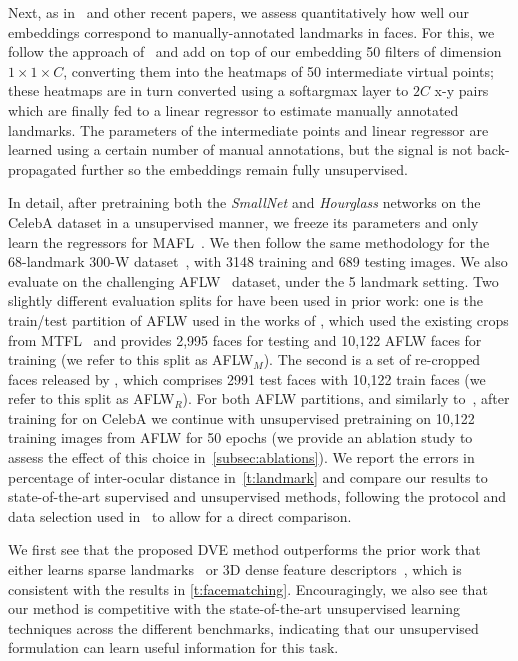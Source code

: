 \documentclass[10pt,twocolumn,letterpaper]{article}
\begin{document}
Next, as in~\cite{thewlis17Bunsupervised} and other recent papers, we assess quantitatively how well our embeddings correspond to manually-annotated landmarks in faces.
For this, we follow the approach of~\cite{thewlis17Bunsupervised} and add on top of our embedding 50 filters of dimension $1\times 1\times C$, converting them into the heatmaps of 50 intermediate virtual points; these heatmaps are in turn converted using a softargmax layer to $2C$ x-y pairs which are finally fed to a linear regressor to estimate manually annotated landmarks.
The parameters of the intermediate points and linear regressor are learned using a certain number of manual annotations, but the signal is not back-propagated further so the embeddings remain fully unsupervised.

In detail, after pretraining both the \textit{SmallNet} and \textit{Hourglass} networks on the CelebA dataset in a unsupervised manner, we freeze its parameters and only learn the regressors for MAFL~\cite{Zhang2016}.  We then follow the same methodology for the 68-landmark 300-W dataset~\cite{sagonas2013}, with 3148 training and 689 testing images.  We also evaluate on the challenging AFLW~\cite{koestinger2011} dataset, under the 5 landmark setting.  Two slightly different evaluation splits for have been used in prior work: one is the train/test partition of AFLW used in the works of \cite{thewlis17unsupervised}, \cite{thewlis17Bunsupervised} which used the existing crops from MTFL~\cite{zhang2014facial} and provides 2,995 faces for testing and 10,122 AFLW faces for training (we refer to this split as AFLW$_M$).  The second is a set of re-cropped faces released by \cite{zhang2018unsupervised}, which comprises 2991 test faces with 10,122 train faces (we refer to this split as AFLW$_R$).  For both AFLW partitions, and similarly to~\cite{thewlis17Bunsupervised}, after training for on CelebA we continue with unsupervised pretraining on 10,122 training images from AFLW for 50 epochs (we provide an ablation study to assess the effect of this choice in~\cref{subsec:ablations}).  We report the errors in percentage of inter-ocular distance in~\cref{t:landmark} and compare our results to state-of-the-art supervised and unsupervised methods, following the protocol and data selection used in~\cite{thewlis17Bunsupervised} to allow for a direct comparison.

We first see that the proposed DVE method outperforms the prior work that either learns sparse landmarks~\cite{thewlis17unsupervised} or 3D dense feature descriptors~\cite{thewlis17Bunsupervised}, which is consistent with the results in \cref{t:facematching}.  Encouragingly, we also see that our method is competitive with the state-of-the-art unsupervised learning techniques across the different benchmarks, indicating that our unsupervised formulation can learn useful information for this task. 
\end{document}
